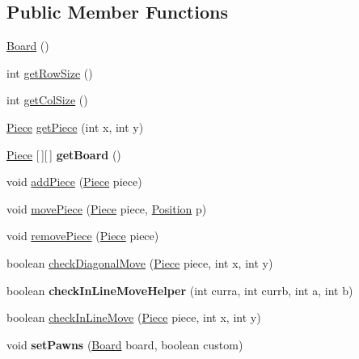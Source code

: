 \subsection*{Public Member Functions}
\begin{DoxyCompactItemize}
\item 
\hyperlink{classmain_1_1_board_ac64a3f3f09655e7a7c8d357571a0cdf9}{Board} ()
\item 
int \hyperlink{classmain_1_1_board_aabe840fa797394de39d654669f1a13e3}{get\+Row\+Size} ()
\item 
int \hyperlink{classmain_1_1_board_ad54aaad9c4592f90902c9176178479f4}{get\+Col\+Size} ()
\item 
\hyperlink{classmain_1_1_piece}{Piece} \hyperlink{classmain_1_1_board_ab7453028b7be41317754865bd98e7c27}{get\+Piece} (int x, int y)
\item 
\mbox{\label{classmain_1_1_board_a3251505af2aca3cba6f42d187c2dedd5}} 
\hyperlink{classmain_1_1_piece}{Piece} \mbox{[}$\,$\mbox{]}\mbox{[}$\,$\mbox{]} {\bfseries get\+Board} ()
\item 
void \hyperlink{classmain_1_1_board_ae50e0afff7effa41b09eb9966983e369}{add\+Piece} (\hyperlink{classmain_1_1_piece}{Piece} piece)
\item 
void \hyperlink{classmain_1_1_board_a3a4955259c7cf7ad67524f8da986d23b}{move\+Piece} (\hyperlink{classmain_1_1_piece}{Piece} piece, \hyperlink{classmain_1_1_position}{Position} p)
\item 
void \hyperlink{classmain_1_1_board_abc2d60f853b5da298d709637546758f8}{remove\+Piece} (\hyperlink{classmain_1_1_piece}{Piece} piece)
\item 
boolean \hyperlink{classmain_1_1_board_a13d0c13bb4ac27d6f7f6c7695eb2fb3e}{check\+Diagonal\+Move} (\hyperlink{classmain_1_1_piece}{Piece} piece, int x, int y)
\item 
\mbox{\label{classmain_1_1_board_afc7aebf0d29dce28ea6b358cc77f8638}} 
boolean {\bfseries check\+In\+Line\+Move\+Helper} (int curra, int currb, int a, int b)
\item 
boolean \hyperlink{classmain_1_1_board_a41d11b3b542eaa65607bc50c0a8ab6b4}{check\+In\+Line\+Move} (\hyperlink{classmain_1_1_piece}{Piece} piece, int x, int y)
\item 
\mbox{\label{classmain_1_1_board_a5e439108a532952162da1d08560dd260}} 
void {\bfseries set\+Pawns} (\hyperlink{classmain_1_1_board}{Board} board, boolean custom)

\end{DoxyCompactItemize}
